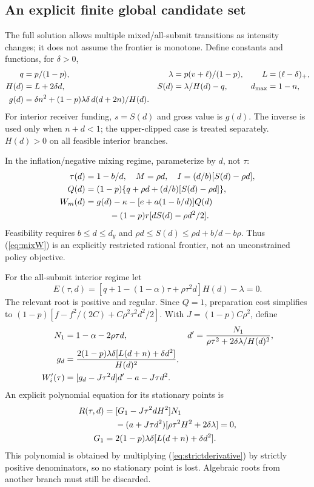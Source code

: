 \documentclass[11pt]{article}
\begin{document}
\subsection{An explicit finite global candidate set}\label{subsec:candidates}
The full solution allows multiple mixed/all-submit transitions as intensity changes; it does not assume the frontier is monotone. Define constants and functions, for $\delta>0$,
\begin{align}
q&=p/(1-p),&\lambda&=p(v+\ell)/(1-p),&L&=(\ell-\delta)_+,\notag\\
H(d)&=L+2\delta d,&S(d)&=\lambda/H(d)-q,&d_{\max}&=1-n,\label{eq:frontierS}\\
g(d)&=\delta n^2+(1-p)\lambda\delta\,d(d+2n)/H(d).\label{eq:frontierg}
\end{align}
For interior receiver funding, $s=S(d)$ and gross value is $g(d)$. The inverse is used only when $n+d<1$; the upper-clipped case is treated separately. $H(d)>0$ on all feasible interior branches.

In the inflation/negative mixing regime, parameterize by $d$, not $\tau$:
\begin{align}
\tau(d)&=1-b/d,\quad M=\rho d,\quad I=(d/b)[S(d)-\rho d],\notag\\
Q(d)&=(1-p)\{q+\rho d+(d/b)[S(d)-\rho d]\},\label{eq:mixfrontier}\\
W_m(d)&=g(d)-\kappa-[e+a(1-b/d)]Q(d)\notag\\
&\hspace{1cm}-(1-p)r[dS(d)-\rho d^2/2].\label{eq:mixW}
\end{align}
Feasibility requires $b\leq d\leq d_y$ and $\rho d\leq S(d)\leq\rho d+b/d-b\rho$. Thus (\ref{eq:mixW}) is an explicitly restricted rational frontier, not an unconstrained policy objective.

For the all-submit interior regime let
\begin{equation}
E(\tau,d)=[q+1-(1-\alpha)\tau+\rho\tau^2d]H(d)-\lambda=0.\label{eq:frontierE}
\end{equation}
The relevant root is positive and regular. Since $Q=1$, preparation cost simplifies to $(1-p)[f-f^2/(2C)+C\rho^2\tau^2d^2/2]$. With $J=(1-p)C\rho^2$, define
\begin{align}
N_1&=1-\alpha-2\rho\tau d,&
d'&=\frac{N_1}{\rho\tau^2+2\delta\lambda/H(d)^2},\label{eq:dprime}\\
g_d&=\frac{2(1-p)\lambda\delta[L(d+n)+\delta d^2]}{H(d)^2},\notag\\
W_i'(\tau)&=[g_d-J\tau^2d]d'-a-J\tau d^2.\label{eq:strictderivative}
\end{align}
An explicit polynomial equation for its stationary points is
\begin{align}
R(\tau,d)={}&[G_1-J\tau^2dH^2]N_1\notag\\
&-(a+J\tau d^2)[\rho\tau^2H^2+2\delta\lambda]=0,\label{eq:frontierR}\\
G_1={}&2(1-p)\lambda\delta[L(d+n)+\delta d^2].\notag
\end{align}
This polynomial is obtained by multiplying (\ref{eq:strictderivative}) by strictly positive denominators, so no stationary point is lost. Algebraic roots from another branch must still be discarded.
\end{document}
